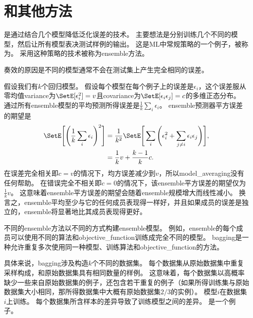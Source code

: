 \section{和其他方法}
\label{sec:bagging_and_other_ensemble_methods}
是通过结合几个模型降低泛化误差的技术\citep{Breiman-1994}。
主要想法是分别训练几个不同的模型，然后让所有模型表决测试样例的输出。
这是\gls{ML}中常规策略的一个例子，被称为。
采用这种策略的技术被称为\gls{ensemble}方法。

奏效的原因是不同的模型通常不会在测试集上产生完全相同的误差。

假设我们有$k$个回归模型。
假设每个模型在每个例子上的误差是$\epsilon_i$，这个误差服从零均值\gls{variance}为$\SetE[\epsilon_i^2] = v$且\gls{covariance}为$\SetE[\epsilon_i \epsilon_j] = c$的多维正态分布。
通过所有\gls{ensemble}模型的平均预测所得误差是$\frac{1}{k} \sum_i \epsilon_i$。 
\gls{ensemble}预测器平方误差的期望是
\begin{align}
 \SetE \Bigg[\Bigg(\frac{1}{k} \sum_i \epsilon_i \Bigg)^2\Bigg] &= \frac{1}{k^2} 
 \SetE \Bigg[\sum_i \Bigg(\epsilon_i^2 + \sum_{j \neq i} \epsilon_i \epsilon_j\Bigg)\Bigg], \\
&= \frac{1}{k} v + \frac{k-1}{k} c .                             
\end{align}
在误差完全相关即$c=v$的情况下，均方误差减少到$v$，所以\gls{model_averaging}没有任何帮助。
在错误完全不相关即$c =0$的情况下，该\gls{ensemble}平方误差的期望仅为$\frac{1}{k}v$。
这意味着\gls{ensemble}平方误差的期望会随着\gls{ensemble}规模增大而线性减小。
换言之，\gls{ensemble}平均至少与它的任何成员表现得一样好，并且如果成员的误差是独立的，\gls{ensemble}将显著地比其成员表现得更好。

不同的\gls{ensemble}方法以不同的方式构建\gls{ensemble}模型。
例如，\gls{ensemble}的每个成员可以使用不同的算法和\gls{objective_function}训练成完全不同的模型。
\gls{bagging}是一种允许重复多次使用同一种模型、训练算法和\gls{objective_function}的方法。


具体来说，\gls{bagging}涉及构造$k$个不同的数据集。
每个数据集从原始数据集中重复采样构成，和原始数据集具有相同数量的样例。
这意味着，每个数据集以高概率缺少一些来自原始数据集的例子，还包含若干重复的例子（如果所得训练集与原始数据集大小相同，那所得数据集中大概有原始数据集$2/3$的实例）。
模型$i$在数据集$i$上训练。
每个数据集所含样本的差异导致了训练模型之间的差异。
是一个例子。

